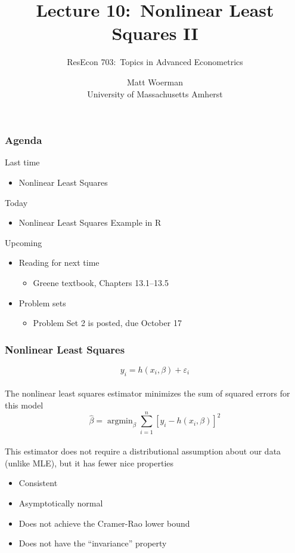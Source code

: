 \documentclass{beamer}\usepackage[]{graphicx}\usepackage[]{color}
\title[Lecture 10:\ Nonlinear Least Squares II]{Lecture 10:\ Nonlinear Least Squares II}
\author[ResEcon 703:\ Advanced Econometrics]{ResEcon 703:\ Topics in Advanced Econometrics}
\date{Matt Woerman\\University of Massachusetts Amherst}
\DeclareMathOperator*{\argmin}{argmin}
\begin{document}
{ 
\begin{frame}[noframenumbering]
    \titlepage
\end{frame}
}

\begin{frame}\frametitle{Agenda}
    Last time
    \begin{itemize}
        \item Nonlinear Least Squares
    \end{itemize}
    \vspace{2ex}
    Today
    \begin{itemize}
        \item Nonlinear Least Squares Example in R
    \end{itemize}
    \vspace{2ex}
    Upcoming
    \begin{itemize}
        \item Reading for next time
        \begin{itemize}
            \item Greene textbook, Chapters 13.1--13.5
        \end{itemize}
        \item Problem sets
        \begin{itemize}
            \item Problem Set 2 is posted, due October 17
        \end{itemize}
    \end{itemize}
\end{frame}

\begin{frame}\frametitle{Nonlinear Least Squares}
    $$y_i = h(x_i, \beta) + \varepsilon_i$$ \\
    \vspace{2ex}
    The nonlinear least squares estimator minimizes the sum of squared errors for this model
    $$\hat{\beta} = \argmin_{\beta} \sum_{i = 1}^n [y_i - h(x_i, \beta)]^2$$ \\
    \vspace{2ex}
    This estimator does not require a distributional assumption about our data (unlike MLE), but it has fewer nice properties
    \begin{itemize}
        \item Consistent
        \item Asymptotically normal
        \item Does not achieve the Cramer-Rao lower bound
        \item Does not have the ``invariance'' property
    \end{itemize}
\end{frame}
\end{document}
